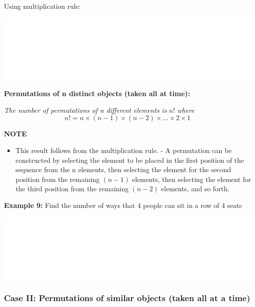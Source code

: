\documentclass[]{book}
\providecommand{\tightlist}{%
  \setlength{\itemsep}{0pt}\setlength{\parskip}{0pt}}
\begin{document}
Using multiplication rule:

\begin{center}\includegraphics[width=1\linewidth]{figure/box85-1} \end{center}

\textbf{Permutations of n distinct objects (taken all at time): }

\emph{The number of permutations of n different elements is} \(n!\) \emph{where}
\[n! = n \times (n-1)\times(n-2)\times \dots \times 2 \times1\]

\textbf{NOTE}

\begin{itemize}
\tightlist
\item
  This result follows from the multiplication rule. - A permutation can be constructed by selecting the element to be placed in the first position of the sequence from the n elements, then selecting the element for the second position from the remaining \((n-1)\) elements, then selecting the element for the third position from the remaining \((n-2)\) elements, and so forth.
\end{itemize}

\textbf{Example 9:} Find the number of ways that 4 people can sit in a row of 4 seats

\begin{center}\includegraphics[width=1\linewidth]{figure/box86-1} \end{center}

\hypertarget{case-ii-permutations-of-similar-objects-taken-all-at-a-time}{%
\subsubsection{Case II: Permutations of similar objects (taken all at a time)}\label{case-ii-permutations-of-similar-objects-taken-all-at-a-time}}
\end{document}
